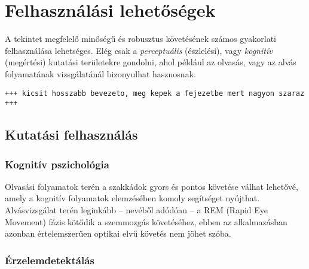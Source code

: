 \chapter{Felhasználási lehetőségek}\label{sect:felhasznalas}

A tekintet megfelelő minőségű és robusztus követésének számos gyakorlati felhasználása lehetséges. Elég csak a \emph{perceptuális} (észlelési), vagy \emph{kognitív} (megértési) kutatási területekre gondolni, ahol például az olvasás, vagy az alvás folyamatának vizsgálatánál bizonyulhat hasznosnak.

\bigskip

\texttt{+++ kicsit hosszabb bevezeto, meg kepek a fejezetbe mert nagyon szaraz +++}

\section{Kutatási felhasználás}\label{sect:tudomanyos}


\subsection{Kognitív pszichológia}\label{sect:kognitiv}

Olvasási folyamatok terén a szakkádok gyors és pontos követése válhat lehetővé, amely a kognitív folyamatok elemzésében komoly segítséget nyújthat. Alvásvizsgálat terén leginkább -- nevéből adódóan -- a REM (Rapid Eye Movement) fázis kötődik a szemmozgás követéséhez, ebben az alkalmazásban azonban értelemszerűen optikai elvű követés nem jöhet szóba.

\subsection{Érzelemdetektálás}\label{sect:erzelem}

